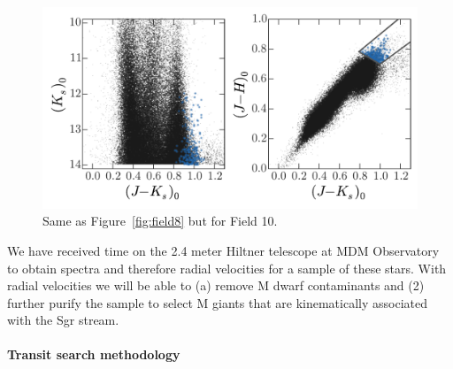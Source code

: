 \documentclass[letterpaper,12pt,preprint]{hack_aastex}
\begin{document}


\begin{figure}[p]
\begin{center}
\includegraphics[width=\textwidth]{fig2.pdf}
\caption{Same as Figure~\ref{fig:field8} but for Field 10. }
\label{fig:field10}
\end{center}
\end{figure}

We have received time on the 2.4 meter Hiltner telescope at MDM Observatory to
obtain spectra and therefore radial velocities for a sample of these stars.
With radial velocities we will be able to (a) remove M dwarf contaminants and
(2) further purify the sample to select M giants that are kinematically
associated with the Sgr stream.


\paragraph{Transit search methodology}
\end{document}
